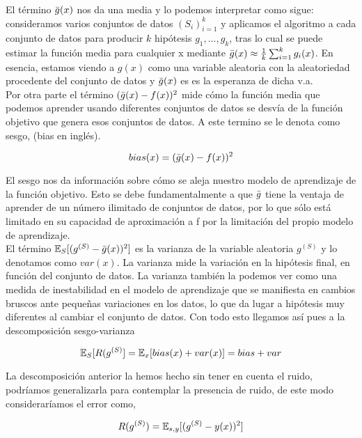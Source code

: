     El término $\Bar{g}(x)$ nos da una media y lo podemos interpretar como sigue: consideramos varios conjuntos de datos $(S_i)_{i=1}^k$ y aplicamos el algoritmo a cada conjunto de datos para producir $k$ hipótesis $g_1,...,g_k$, tras lo cual se puede estimar la función media para cualquier x mediante $\Bar{g}(x) \approx \frac{1}{k}\sum_{i=1}^k g_i(x)$. En esencia, estamos viendo a $g(x)$ como una variable aleatoria con la aleatoriedad procedente del conjunto de datos y $\Bar{g}(x)$ es es la esperanza de dicha v.a.\\
    
    Por otra parte el término $(\Bar{g}(x) - f(x))^2$ mide cómo la función media que podemos aprender usando diferentes conjuntos de datos se desvía de la función objetivo que genera esos conjuntos de datos. A este termino se le denota como sesgo, (bias en inglés).
    
    \begin{equation}
        bias(x) = (\Bar{g}(x) - f(x))^2
    \end{equation}
    
    \noindent El sesgo nos da información sobre cómo se aleja nuestro modelo de aprendizaje de la función objetivo. Esto se debe fundamentalmente a que $\Bar{g}$ tiene la ventaja de aprender de un número ilimitado de conjuntos de datos, por lo que sólo está limitado en su capacidad de aproximación a f por la limitación del propio modelo de aprendizaje.\\
    
    El término $\mathbb{E}_S[(g^{(S)} - \Bar{g}(x))^2]$ es la varianza de la variable aleatoria $g^{(S)}$ y lo denotamos como $var(x)$. La varianza mide la variación en la hipótesis final, en función del conjunto de datos. La varianza también la podemos ver como una medida de inestabilidad en el modelo de aprendizaje que se manifiesta en cambios bruscos ante pequeñas variaciones en los datos, lo que da lugar a hipótesis muy diferentes al cambiar el conjunto de datos. Con todo esto llegamos así pues a la descomposición sesgo-varianza
    
    \begin{equation}
        \mathbb{E}_S[R(g^{(S)}] = \mathbb{E}_x[bias(x) + var(x)] = bias + var
    \end{equation}
    
    La descomposición anterior la hemos hecho sin tener en cuenta el ruido, podríamos generalizarla para contemplar la presencia de ruido, de este modo consideraríamos el error como, 
    
    \begin{equation}
        R(g^{(S)}) = \mathbb{E}_{s,y}[(g^{(S)} - y(x))^2]
    \end{equation}
    
